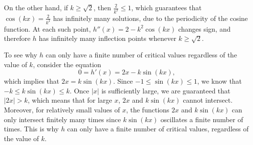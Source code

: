\begin{activitySolution}
On the other hand, if $k \ge \sqrt{2}$, then $\frac{2}{k^2} \le 1$, which guarantees that $\cos(kx) = \frac{2}{k^2}$ has infinitely many solutions, due to the periodicity of the cosine function.  At each such point, $h''(x) = 2 - k^2 \cos(kx)$ changes sign, and therefore $h$ has infinitely many inflection points whenever $k \ge \sqrt{2}$.	 
		\item To see why $h$ can only have a finite number of critical values regardless of the value of $k$, consider the equation
		$$0 = h'(x) = 2x - k\sin(kx),$$
		which implies that $2x = k\sin(kx)$.  Since $-1 \le \sin(kx) \le 1$, we know that $-k \le k\sin(kx) \le k$.  Once $|x|$ is sufficiently large, we are guaranteed that $|2x| > k$, which means that for large $x$, $2x$ and $k\sin(kx)$ cannot intersect.   Moreover, for relatively small values of $x$, the functions $2x$ and $k\sin(kx)$ can only intersect finitely many times since $k\sin(kx)$ oscillates a finite number of times.  This is why $h$ can only have a finite number of critical values, regardless of the value of $k$.
	\ea
\end{activitySolution}
\aftera